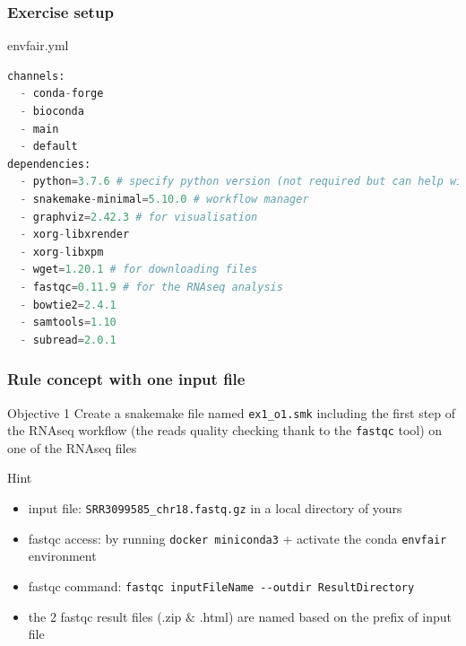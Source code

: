 \begin{frame}[containsverbatim]
\frametitle{Exercise setup}
\begin{exampleblock}{envfair.yml}
\begin{lstlisting}[language=python]
channels:
  - conda-forge
  - bioconda
  - main
  - default
dependencies:
  - python=3.7.6 # specify python version (not required but can help with downstream conflicts)
  - snakemake-minimal=5.10.0 # workflow manager
  - graphviz=2.42.3 # for visualisation
  - xorg-libxrender
  - xorg-libxpm
  - wget=1.20.1 # for downloading files
  - fastqc=0.11.9 # for the RNAseq analysis
  - bowtie2=2.4.1
  - samtools=1.10
  - subread=2.0.1
\end{lstlisting}
\end{exampleblock}
\end{frame}
\begin{frame}[containsverbatim]
\frametitle{Rule concept with one input file}
\begin{exampleblock}{Objective 1}
Create a snakemake file named \verb|ex1_o1.smk| including the first step of the RNAseq workflow (the reads quality checking thank to the \verb|fastqc| tool) on one of the RNAseq files
\end{exampleblock}
\begin{exampleblock}{Hint}
\begin{itemize}
    \item input file: \verb|SRR3099585_chr18.fastq.gz| in a local directory of yours
    \item fastqc access: by running \verb|docker miniconda3| + activate the conda \verb|envfair| environment
    \item fastqc command: \verb|fastqc inputFileName --outdir ResultDirectory|
    \item the 2 fastqc result files (.zip $\&$ .html) are named based on the prefix of input file
\end{itemize}
\end{exampleblock}
\end{frame}

